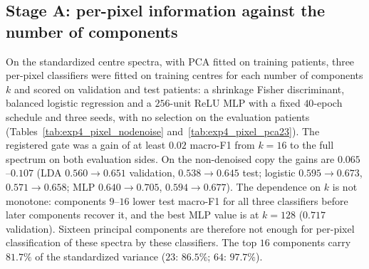 \subsection{Stage A: per-pixel information against the number of components}
On the standardized centre spectra, with PCA fitted on training patients, three
per-pixel classifiers were fitted on training centres for each number of components
$k$ and scored on validation and test patients: a shrinkage Fisher discriminant,
balanced logistic regression and a $256$-unit ReLU MLP with a fixed $40$-epoch
schedule and three seeds, with no selection on the evaluation patients
(Tables~\ref{tab:exp4_pixel_nodenoise} and~\ref{tab:exp4_pixel_pca23}). The
registered gate was a gain of at least $0.02$ macro-F1 from $k=16$ to the full
spectrum on both evaluation sides. On the non-denoised copy the gains are
$0.065$--$0.107$ (LDA $0.560\to0.651$ validation, $0.538\to0.645$ test; logistic
$0.595\to0.673$, $0.571\to0.658$; MLP $0.640\to0.705$, $0.594\to0.677$). The
dependence on $k$ is not monotone: components $9$--$16$ lower test macro-F1 for all
three classifiers before later components recover it, and the best MLP value is at
$k=128$ ($0.717$ validation). Sixteen principal components are therefore not enough for
per-pixel classification of these spectra by these classifiers. The top $16$
components carry $81.7\%$ of the standardized variance ($23$: $86.5\%$; $64$:
$97.7\%$).

